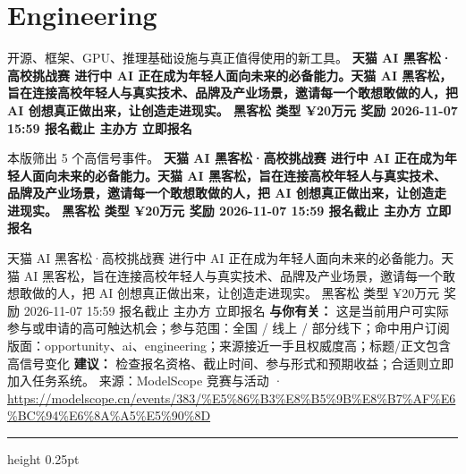 \documentclass[10.5pt]{ctexart}
\begin{document}
\section*{Engineering}
{\color{ormuted} 开源、框架、GPU、推理基础设施与真正值得使用的新工具。}
\vspace{2mm}
{\LARGE\bfseries 天猫 AI 黑客松·高校挑战赛 进行中 AI 正在成为年轻人面向未来的必备能力。天猫 AI 黑客松，旨在连接高校年轻人与真实技术、品牌及产业场景，邀请每一个敢想敢做的人，把 AI 创想真正做出来，让创造走进现实。 黑客松 类型 ¥20万元 奖励 2026-11-07 15:59 报名截止 主办方 立即报名}\par
\vspace{1mm}
{\color{ormuted} 本版筛出 5 个高信号事件。}
\vspace{3mm}
{\Large\bfseries 天猫 AI 黑客松·高校挑战赛 进行中 AI 正在成为年轻人面向未来的必备能力。天猫 AI 黑客松，旨在连接高校年轻人与真实技术、品牌及产业场景，邀请每一个敢想敢做的人，把 AI 创想真正做出来，让创造走进现实。 黑客松 类型 ¥20万元 奖励 2026-11-07 15:59 报名截止 主办方 立即报名}\par
天猫 AI 黑客松·高校挑战赛 进行中 AI 正在成为年轻人面向未来的必备能力。天猫 AI 黑客松，旨在连接高校年轻人与真实技术、品牌及产业场景，邀请每一个敢想敢做的人，把 AI 创想真正做出来，让创造走进现实。 黑客松 类型 ¥20万元 奖励 2026-11-07 15:59 报名截止 主办方 立即报名
\textbf{与你有关：} 这是当前用户可实际参与或申请的高可触达机会；参与范围：全国 / 线上 / 部分线下；命中用户订阅版面：opportunity、ai、engineering；来源接近一手且权威度高；标题/正文包含高信号变化
\textbf{建议：} 检查报名资格、截止时间、参与形式和预期收益；合适则立即加入任务系统。
{\footnotesize\color{ormuted} 来源：ModelScope 竞赛与活动 · \url{https://modelscope.cn/events/383/%E5%86%B3%E8%B5%9B%E8%B7%AF%E6%BC%94%E6%8A%A5%E5%90%8D}}
\vspace{4mm}
\hrule height 0.25pt
\vspace{3mm}
\end{document}
